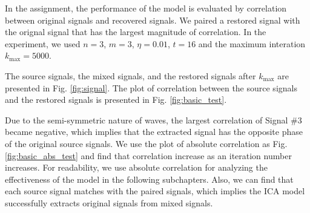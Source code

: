 \documentclass[conference]{IEEEtran}
\begin{document}
In the assignment, the performance of the model is evaluated by correlation between original signals and recovered signals. We paired a restored signal with the orignal signal that has the largest magnitude of correlation. In the experiment, we used $n=3$, $m=3$, $\eta=0.01$, $t=16$ and the maximum interation $k_{\text{max}} = 5000$.

The source signals, the mixed signals, and the restored signals after $k_{\text{max}}$ are presented in Fig. \ref{fig:signal}.
The plot of correlation between the source signals and the restored signals is presented in Fig. \ref{fig:basic_test}.

Due to the semi-symmetric nature of waves, the largest correlation of Signal \#3 became negative, which implies that the extracted signal has the opposite phase of the original source signals. We use the plot of absolute correlation as Fig. \ref{fig:basic_abs_test} and find that correlation increase as an iteration number increases. For readability, we use absolute correlation for analyzing the effectiveness of the model in the following subchapters. Also, we can find that each source signal matches with the paired signals, which implies the ICA model successfully extracts original signals from mixed signals.
\end{document}
